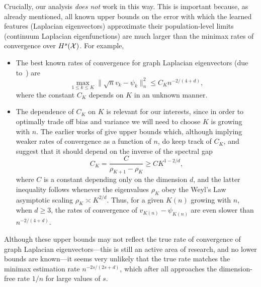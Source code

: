 Crucially, our analysis \emph{does not} work in this way. This is important because, as already mentioned, all known upper bounds on the error with which the learned features (Laplacian eigenvectors) approximate their population-level limits (continuum Laplacian eigenfunctions) are much larger than the minimax rates of convergence over $H^s(\mathcal{X})$. For example,
\begin{itemize}
	\item The best known rates of convergence for graph Laplacian eigenvectors (due to~\cite{cheng2021}) are
	\begin{equation}
	\label{eqn:eigenvector_convergence}
	\max_{1 \leq k \leq K}\|\sqrt{n}v_k - \psi_k\|_n^2 \leq C_{K} n^{-2/(4 + d)},
	\end{equation}
	where the constant $C_K$ depends on $K$ in an unknown manner.
	\item The dependence of $C_K$ on $K$ is relevant for our interests, since in order to optimally trade off bias and variance we will need to choose $K$ is growing with $n$. The earlier works of \cite{burago2014,trillos2019} give upper bounds which, although implying weaker rates of convergence as a function of $n$, do keep track of $C_K$, and suggest that it should depend on the inverse of the spectral gap 
	\begin{equation}
	\label{eqn:spectral_gap}
	C_K = \frac{C}{\rho_{K + 1} - \rho_K} \geq C K^{1 - 2/d},
	\end{equation}
	where $C$ is a constant depending only on the dimension $d$, and the latter inequality follows whenever the eigenvalues $\rho_K$ obey the Weyl's Law asymptotic scaling $\rho_K \asymp K^{2/d}$. Thus, for a given $K(n)$ growing with $n$, when $d \geq 3$, the rates of convergence of $v_{K(n)} - \psi_{K(n)}$ are even slower than $n^{-2/(4 + d)}$. 
\end{itemize}
Although these upper bounds may not reflect the true rate of convergence of graph Laplacian eigenvectors---this is still an active area of research, and no lower bounds are known---it seems very unlikely that the true rate matches the minimax estimation rate $n^{-2s/(2s + d)}$, which after all approaches the dimension-free rate $1/n$ for large values of $s$. 

